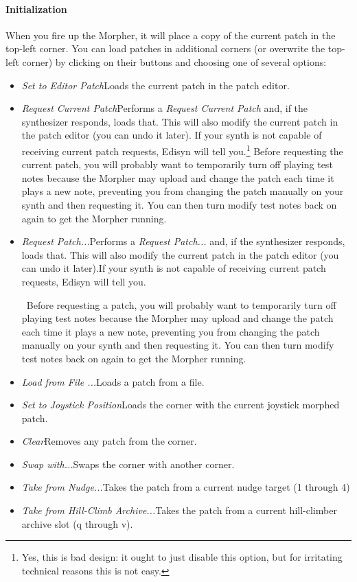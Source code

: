 \documentclass{article}
\begin{document}
\paragraph{Initialization} When you fire up the Morpher, it will place a copy of the current patch in the top-left corner.  You can load patches in additional corners (or overwrite the top-left corner) by clicking on their buttons and choosing one of several options:

\begin{itemize}
\item {\it Set to Editor Patch}\quad Loads the current patch in the patch editor.
\item {\it Request Current Patch}\quad Performs a {\it Request Current Patch} and, if the synthesizer responds, loads that.  This will also modify the current patch in the patch editor (you can undo it later).  If your synth is not capable of receiving current patch requests, Edisyn will tell you.\footnote{Yes, this is bad design: it ought to just disable this option, but for irritating technical reasons this is not easy.}  Before requesting the current patch, you will probably want to temporarily turn off playing test notes because the Morpher may upload and change the patch each time it plays a new note, preventing you from changing the patch manually on your synth and then requesting it.  You can then turn modify test notes back on again to get the Morpher running.
\item {\it Request Patch...}\quad Performs a {\it Request Patch...} and, if the synthesizer responds, loads that.  This will also modify the current patch in the patch editor (you can undo it later).If your synth is not capable of receiving current patch requests, Edisyn will tell you.\addtocounter{footnote}{-1}\footnotemark\ Before requesting a patch, you will probably want to temporarily turn off playing test notes because the Morpher may upload and change the patch each time it plays a new note, preventing you from changing the patch manually on your synth and then requesting it.  You can then turn modify test notes back on again to get the Morpher running.
\item {\it Load from File ...}\quad Loads a patch from a file.
\item {\it Set to Joystick Position}\quad Loads the corner with the current joystick morphed patch.
\item {\it Clear}\quad Removes any patch from the corner.
\item {\it Swap with...}\quad Swaps the corner with another corner.
\item {\it Take from Nudge...}\quad Takes the patch from a current nudge target (1 through 4)
\item {\it Take from Hill-Climb Archive...}\quad Takes the patch from a current hill-climber archive slot (q through v).
\end{itemize}
\end{document}
